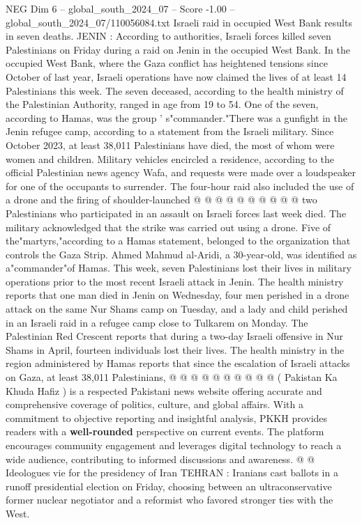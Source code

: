 \begin{textsample}{NEG Dim 6 – global\_south\_2024\_07 – Score -1.00 – global\_south\_2024\_07/110056084.txt}  \label{ex:f6_neg_129}
Israeli raid in occupied West Bank results in seven deaths.
JENIN : According to authorities, Israeli forces killed seven Palestinians on Friday during a raid on Jenin in the occupied West Bank.
In the occupied West Bank, where the Gaza conflict has heightened tensions since October of last year, Israeli operations have now claimed the lives of at least 14 Palestinians this week.
The seven deceased, according to the health ministry of the Palestinian Authority, ranged in age from 19 to 54.
One of the seven, according to Hamas, was the group ' s"commander."There was a gunfight in the Jenin refugee camp, according to a statement from the Israeli military.
Since October 2023, at least 38,011 Palestinians have died, the most of whom were women and children.
Military vehicles encircled a residence, according to the official Palestinian news agency Wafa, and requests were made over a loudspeaker for one of the occupants to surrender.
The four-hour raid also included the use of a drone and the firing of shoulder-launched @ @ @ @ @ @ @ @ @ @ two Palestinians who participated in an assault on Israeli forces last week died.
The military acknowledged that the strike was carried out using a drone.
Five of the"martyrs,"according to a Hamas statement, belonged to the organization that controls the Gaza Strip.
Ahmed Mahmud al-Aridi, a 30-year-old, was identified as a"commander"of Hamas.
This week, seven Palestinians lost their lives in military operations prior to the most recent Israeli attack in Jenin.
The health ministry reports that one man died in Jenin on Wednesday, four men perished in a drone attack on the same Nur Shams camp on Tuesday, and a lady and child perished in an Israeli raid in a refugee camp close to Tulkarem on Monday.
The Palestinian Red Crescent reports that during a two-day Israeli offensive in Nur Shams in April, fourteen individuals lost their lives.
The health ministry in the region administered by Hamas reports that since the escalation of Israeli attacks on Gaza, at least 38,011 Palestinians, @ @ @ @ @ @ @ @ @ @ ( Pakistan Ka Khuda Hafiz ) is a respected Pakistani news website offering accurate and comprehensive coverage of politics, culture, and global affairs.
With a commitment to objective reporting and insightful analysis, PKKH provides readers with a \textbf{well-rounded} perspective on current events.
The platform encourages community engagement and leverages digital technology to reach a wide audience, contributing to informed discussions and awareness. @ @ Ideologues vie for the presidency of Iran TEHRAN : Iranians cast ballots in a runoff presidential election on Friday, choosing between an ultraconservative former nuclear negotiator and a reformist who favored stronger ties with the West.

\end{textsample}
